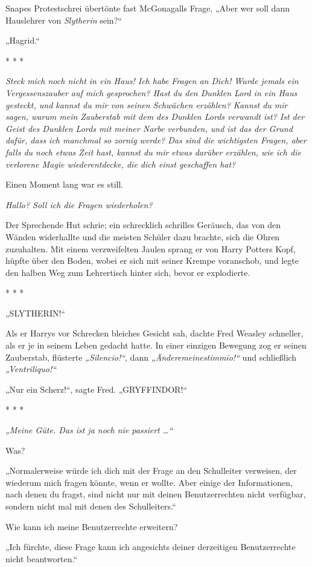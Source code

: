 {Snapes Protestschrei übertönte fast McGonagalls Frage, „Aber wer soll dann Hauslehrer von \emph{Slytherin} sein?“

„Hagrid.“

* * *

\emph{Steck mich noch nicht in ein Haus! Ich habe Fragen an Dich! Wurde jemals ein Vergessenszauber auf mich gesprochen? Hast du den Dunklen Lord in ein Haus gesteckt, und kannst du mir von seinen Schwächen erzählen? Kannst du mir sagen, warum mein Zauberstab mit dem des Dunklen Lords verwandt ist? Ist der Geist des Dunklen Lords mit meiner Narbe verbunden, und ist das der Grund dafür, dass ich manchmal so zornig werde? Das sind die wichtigsten Fragen, aber falls du noch etwas Zeit hast, kannst du mir etwas darüber erzählen, wie ich die verlorene Magie wiederentdecke, die dich einst geschaffen hat?}

Einen Moment lang war es still.

\emph{Hallo? Soll ich die Fragen wiederholen?}

Der Sprechende Hut schrie; ein schrecklich schrilles Geräusch, das von den Wänden widerhallte und die meisten Schüler dazu brachte, sich die Ohren zuzuhalten. Mit einem verzweifelten Jaulen sprang er von Harry Potters Kopf, hüpfte über den Boden, wobei er sich mit seiner Krempe voranschob, und legte den halben Weg zum Lehrertisch hinter sich, bevor er explodierte.

* * *

„SLYTHERIN!“

Als er Harrys vor Schrecken bleiches Gesicht sah, dachte Fred Weasley schneller, als er je in seinem Leben gedacht hatte. In einer einzigen Bewegung zog er seinen Zauberstab, flüsterte \emph{„Silencio!“}, dann \emph{„Änderemeinestimmio!“} und schließlich \emph{„Ventriliquo!“}

„Nur ein Scherz!“, sagte Fred. „GRYFFINDOR!“

* * *

\emph{„Meine Güte. Das ist ja noch nie passiert …“}

Was?

„Normalerweise würde ich dich mit der Frage an den Schulleiter verweisen, der wiederum mich fragen könnte, wenn er wollte. Aber einige der Informationen, nach denen du fragst, sind nicht nur mit deinen Benutzerrechten nicht verfügbar, sondern nicht mal mit denen des Schulleiters.“

Wie kann ich meine Benutzerrechte erweitern?

„Ich fürchte, diese Frage kann ich angesichts deiner derzeitigen Benutzerrechte nicht beantworten.“

}
